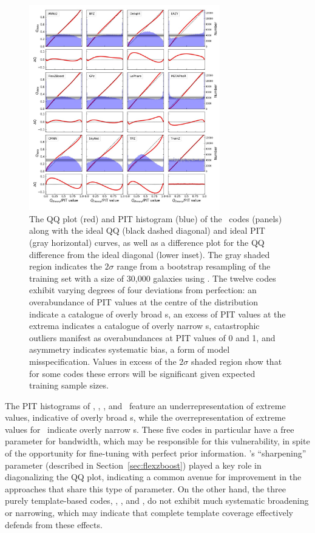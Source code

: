 \begin{figure}
\centering
\includegraphics[width=0.74\textwidth]{fig/PITANDQQplot_12codes_withsigmaband_crop.jpg}
\caption{The QQ plot (red) and PIT histogram (blue) of the \pzpdf\ codes (panels) along with the ideal QQ (black dashed diagonal) and ideal PIT (gray horizontal) curves, as well as a difference plot for the QQ difference from the ideal diagonal (lower inset).
The gray shaded region indicates the $2 \sigma$ range from a bootstrap resampling of the training set with a size of 30,000 galaxies using \trainz.
The twelve codes exhibit varying degrees of four deviations from perfection: an overabundance of PIT values at the centre of the distribution indicate a catalogue of overly broad \pzpdf s, an excess of PIT values at the extrema indicates a catalogue of overly narrow \pzpdf s, catastrophic outliers manifest as overabundances at PIT values of 0 and 1, and asymmetry indicates systematic bias, a form of model misspecification.
Values in excess of the $2\sigma$ shaded region show that for some codes these errors will be significant given expected training sample sizes.}
\label{fig:pitqq}
\end{figure}

The PIT histograms of \delight, \cmnn, \skynet, and \tpz\ feature an underrepresentation of extreme values, indicative of overly broad \pzpdf s, while the overrepresentation of extreme values for \metaphor\ indicate overly narrow \pzpdf s.
These five codes in particular have a free parameter for bandwidth, which may be responsible for this vulnerability, in spite of the opportunity for fine-tuning with perfect prior information.
\flexzboost's ``sharpening'' parameter (described in Section~\ref{sec:flexzboost}) played a key role in diagonalizing the QQ plot, indicating a common avenue for improvement in the approaches that share this type of parameter.
On the other hand, the three purely template-based codes, \bpz, \eazy, and \lephare, do not exhibit much systematic broadening or narrowing, which may indicate that complete template coverage effectively defends from these effects.

